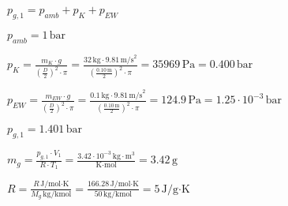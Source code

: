 \( p_{g,1} = p_{amb} + p_{K} + p_{EW} \)  

\( p_{amb} = 1 \, \text{bar} \)  

\( p_{K} = \frac{m_K \cdot g}{\left(\frac{D}{2}\right)^2 \cdot \pi} = \frac{32 \, \text{kg} \cdot 9.81 \, \text{m/s}^2}{\left(\frac{0.10 \, \text{m}}{2}\right)^2 \cdot \pi} = 35969 \, \text{Pa} = 0.400 \, \text{bar} \)  

\( p_{EW} = \frac{m_{EW} \cdot g}{\left(\frac{D}{2}\right)^2 \cdot \pi} = \frac{0.1 \, \text{kg} \cdot 9.81 \, \text{m/s}^2}{\left(\frac{0.10 \, \text{m}}{2}\right)^2 \cdot \pi} = 124.9 \, \text{Pa} = 1.25 \cdot 10^{-3} \, \text{bar} \)  

\( p_{g,1} = 1.401 \, \text{bar} \)  

\( m_g = \frac{p_{g,1} \cdot V_1}{R \cdot T_1} = \frac{3.42 \cdot 10^{-3} \, \text{kg} \cdot \text{m}^3}{\text{K} \cdot \text{mol}} = 3.42 \, \text{g} \)  

\( R = \frac{R \, \text{J/mol·K}}{M_g \, \text{kg/kmol}} = \frac{166.28 \, \text{J/mol·K}}{50 \, \text{kg/kmol}} = 5 \, \text{J/g·K} \)